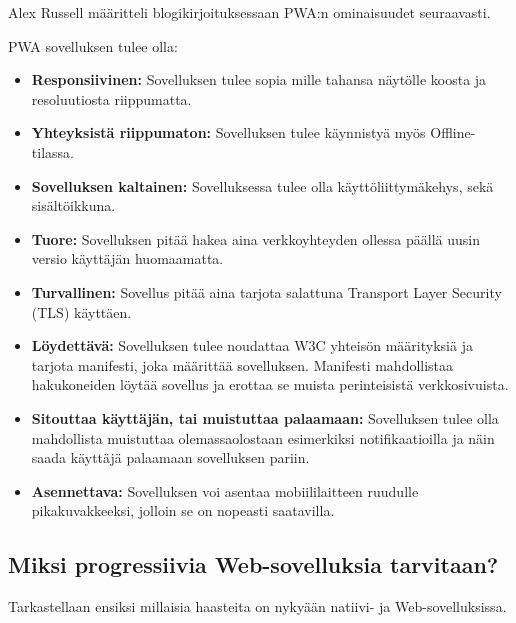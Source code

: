 \documentclass{tktltiki}
\begin{document}
Alex Russell määritteli blogikirjoituksessaan PWA:n ominaisuudet seuraavasti. 

PWA sovelluksen tulee olla:
\begin{itemize}
  \item \textbf{Responsiivinen:} Sovelluksen tulee sopia mille tahansa näytölle koosta ja resoluutiosta riippumatta.
  \item \textbf{Yhteyksistä riippumaton:} Sovelluksen tulee käynnistyä myös Offline-tilassa.
  \item \textbf{Sovelluksen kaltainen:} Sovelluksessa tulee olla käyttöliittymäkehys, sekä sisältöikkuna.
  \item \textbf{Tuore:} Sovelluksen pitää hakea aina verkkoyhteyden ollessa päällä uusin versio käyttäjän huomaamatta.
  \item \textbf{Turvallinen:} Sovellus pitää aina tarjota salattuna Transport Layer Security (TLS) käyttäen.
  \item \textbf{Löydettävä:} Sovelluksen tulee noudattaa W3C yhteisön määrityksiä ja tarjota manifesti, joka määrittää sovelluksen. Manifesti mahdollistaa hakukoneiden löytää sovellus ja erottaa se muista perinteisistä verkkosivuista.
  \item \textbf{Sitouttaa käyttäjän, tai muistuttaa palaamaan:} Sovelluksen tulee olla mahdollista muistuttaa olemassaolostaan esimerkiksi notifikaatioilla ja näin saada käyttäjä palaamaan sovelluksen pariin.
  \item \textbf{Asennettava:} Sovelluksen voi asentaa mobiililaitteen ruudulle pikakuvakkeeksi, jolloin se on nopeasti saatavilla.
\end{itemize}

\subsection{Miksi progressiivia Web-sovelluksia tarvitaan?}
\enlargethispage{5mm}

Tarkastellaan ensiksi millaisia haasteita on nykyään natiivi- ja Web-sovelluksissa.
\end{document}
